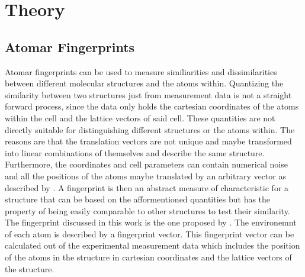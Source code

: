 
\chapter{Theory} %

\label{Chapter1} %


\newcommand{\keyword}[1]{\textbf{#1}}
\newcommand{\tabhead}[1]{\textbf{#1}}
\newcommand{\code}[1]{\texttt{#1}}
\newcommand{\file}[1]{\texttt{\bfseries#1}}
\newcommand{\option}[1]{\texttt{\itshape#1}}


\section{Atomar Fingerprints}
Atomar fingerprints can be used to measure similiarities and dissimilarities between different molecular structures and the atoms within. Quantizing the similarity between two structures just from measurement data is not a straight forward process, since the data only holds the cartesian coordinates of the atoms within the cell and the lattice vectors of said cell. These  quantities are not directly suitable for distinguishing different structures or the atoms within. The reasons are that the translation vectors are not unique and maybe transformed into linear combinations of themselves and describe the same structure. Furthermore, the coordinates and cell parameters can contain numerical noise and all the positions of the atoms maybe translated by an arbitrary vector as described by \cite{Lonie2012}. A fingerprint is then an abstract measure of characteristic for a structure that can be based on the afformentioned quantities but has the property of being easily comparable to other structures to test their similarity. The fingerprint discussed in this work is the one proposed by \cite{Zhu2016}. The environemnt of each atom is described by a fingerprint vector. This fingerprint vector can be calculated out of the experimental measurement data which includes the position of the atoms in the structure in cartesian coordinates and the lattice vectors of the structure. \\
